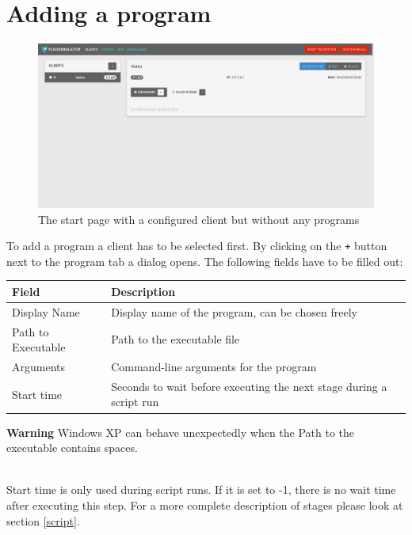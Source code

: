 \documentclass[accentcolor=tud1a, paper=a4, colorback]{tudreport}
\begin{document}
	\section{Adding a program}
	\begin{figure}[H]
		\centering
		\label{startpage_without_programs}
		\includegraphics[width=.9\textwidth]{startpage_without_programs}
		\caption{The start page with a configured client but without any programs}
	\end{figure}
	To add a program a client has to be selected first. By clicking on the \texttt{+}
	button next to the program tab a dialog opens. The following fields have to be filled
	out:
	\begin{center}
	\begin{tabular}{l|l}
		Field & Description \\\hline
		Display Name &  Display name of the program, can be chosen freely\\
		Path to Executable & Path to the executable file\\
		Arguments & Command-line arguments for the program\\
		Start time & Seconds to wait before executing the next stage during a script run\\
	\end{tabular}
		\begin{tcolorbox}[width=\textwidth, colback=red!30, arc=0pt, boxrule=0pt]
		{\color{red}\textbf{Warning}}\hspace{0.5cm}
		Windows XP can behave unexpectedly when the Path to the executable contains spaces.
		\end{tcolorbox}
	\end{center}
	\\
	Start time is only used during script runs. If it is set to -1, there is
	no wait time after executing this step. For a more complete description of
	stages please look at section \ref{script}.
\end{document}
